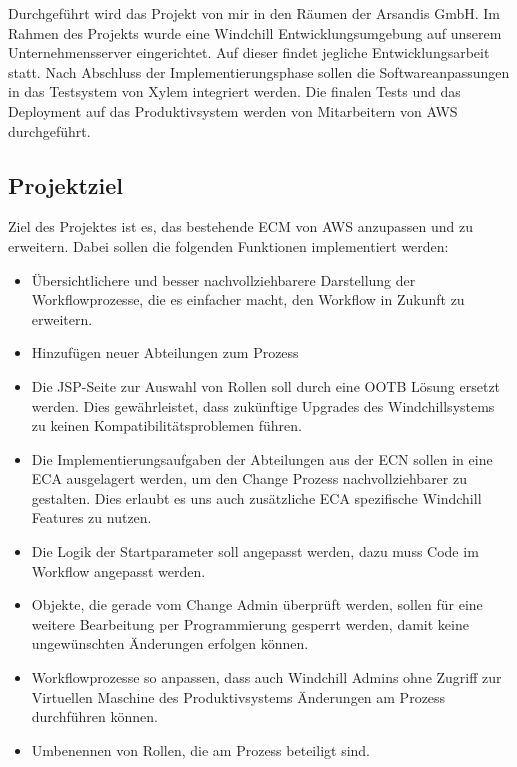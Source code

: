 Durchgeführt wird das Projekt von mir in den Räumen der Arsandis GmbH.
Im Rahmen des Projekts wurde eine Windchill Entwicklungsumgebung auf unserem Unternehmensserver eingerichtet.
Auf dieser findet jegliche Entwicklungsarbeit statt.
Nach Abschluss der Implementierungsphase sollen die Softwareanpassungen in das Testsystem von Xylem integriert werden.
Die finalen Tests und das Deployment auf das Produktivsystem werden von Mitarbeitern von AWS durchgeführt.

\subsection{Projektziel} 
\label{sec:Projektziel}
Ziel des Projektes ist es, das bestehende \ac{ECM} von \ac{AWS} anzupassen und zu erweitern.
Dabei sollen die folgenden Funktionen implementiert werden:
\begin{itemize}
	\item Übersichtlichere und besser nachvollziehbarere Darstellung der Workflowprozesse, die es einfacher macht, den Workflow in Zukunft zu erweitern.
	\item Hinzufügen neuer Abteilungen zum Prozess
	\item Die \ac{JSP}-Seite zur Auswahl von Rollen soll durch eine \ac{OOTB} Lösung ersetzt werden.
	Dies gewährleistet, dass zukünftige Upgrades des Windchillsystems zu keinen Kompatibilitätsproblemen führen.
	\item Die Implementierungsaufgaben der Abteilungen aus der \ac{ECN} sollen in eine \ac{ECA} ausgelagert werden, um den Change Prozess nachvollziehbarer zu gestalten.
	Dies erlaubt es uns auch zusätzliche \ac{ECA} spezifische Windchill Features zu nutzen.
	\item Die Logik der Startparameter soll angepasst werden, dazu muss Code im Workflow angepasst werden.
	\item Objekte, die gerade vom Change Admin überprüft werden, sollen für eine weitere Bearbeitung per Programmierung gesperrt werden, damit keine ungewünschten Änderungen erfolgen können.
	\item Workflowprozesse so anpassen, dass auch Windchill Admins ohne Zugriff zur Virtuellen Maschine des Produktivsystems Änderungen am Prozess durchführen können.
	\item Umbenennen von Rollen, die am Prozess beteiligt sind.
\end{itemize}

